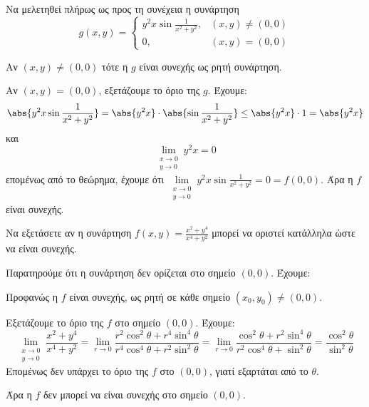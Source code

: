 \begin{example}
  Να μελετηθεί πλήρως ως προς τη συνέχεια η συνάρτηση 
  \[
    g(x,y) = 
    \begin{cases} 
      y^{2}x \sin{\frac{1}{x^{2}+y^{2}}}, & (x,y) 
      \neq (0,0) \\ 0, & (x,y) = (0,0)
    \end{cases}  
  \] 
  \begin{solution}
  \item {}
    Αν $ (x,y) \neq (0,0) $ τότε η $g$ είναι συνεχής 
    ως ρητή συνάρτηση.

    Αν $ (x,y)=(0,0) $, εξετάζουμε το όριο της $g$. 
    Έχουμε:
    \[
      \abs{y^{2}x \sin{\frac{1}{x^{2}+y^{2}}}} = 
      \abs{y^{2}x}\cdot \abs{\sin{\frac{1}{x^{2}+y^{2}}}}
      \leq \abs{y^{2}x} \cdot 1 = \abs{y^{2}x}  
    \] 
    και 
    \[
      \lim\limits_{\substack{x\to 0 \\y \to 0}} y^{2}x = 0 
    \] 
    επομένως από το θεώρημα, έχουμε ότι 
    $ \lim\limits_{\substack{x\to 0 \\y \to 0}} y^{2}x 
    \sin{\frac{1}{x^{2}+y^{2}}} = 0 = f(0,0) $. Άρα η $f$ είναι συνεχής.
  \end{solution}
\end{example}

\begin{example}
  Να εξετάσετε αν η συνάρτηση $ f(x,y) = \frac{x^{2}+y^{4}}{x^{4}+y^{2}} $ μπορεί να 
  οριστεί κατάλληλα ώστε να είναι συνεχής.
  \begin{solution}
    Παρατηρούμε ότι η συνάρτηση δεν ορίζεται στο σημείο $ (0,0) $. Έχουμε:
    \begin{myitemize}
      \item Προφανώς η $f$ είναι συνεχής, ως ρητή σε κάθε σημείο 
        $ (x_{0}, y_{0}) \neq (0,0) $.  
      \item Εξετάζουμε το όριο της $f$ στο σημείο $ (0,0) $. Έχουμε:
        \[
          \lim\limits_{\substack{x\to 0 \\y \to 0}} \frac{x^{2}+y^{4}}{x^{4}+y^{2}} =
          \lim_{r \to 0} \frac{r^{2} \cos^{2}{\theta} + r^{4} 
          \sin^{4}{\theta}}{r^{4} \cos^{4}{\theta} + r^{2} \sin^{2}{\theta}} =
          \lim_{r \to 0} \frac{\cos^{2}{\theta} + r^{2} \sin^{4}{\theta}}{r^{2}
          \cos^{4}{\theta} + \sin^{2}{\theta}} =
          \frac{\cos^{2}{\theta}}{\sin^{2}{\theta}}
        \] 
        Επομένως δεν υπάρχει το όριο της $f$ στο $ (0,0) $, γιατί εξαρτάται από το
        $\theta$. 
    \end{myitemize}
    Άρα η $f$ δεν μπορεί να είναι συνεχής στο σημείο $(0,0)$.
  \end{solution}
\end{example}

